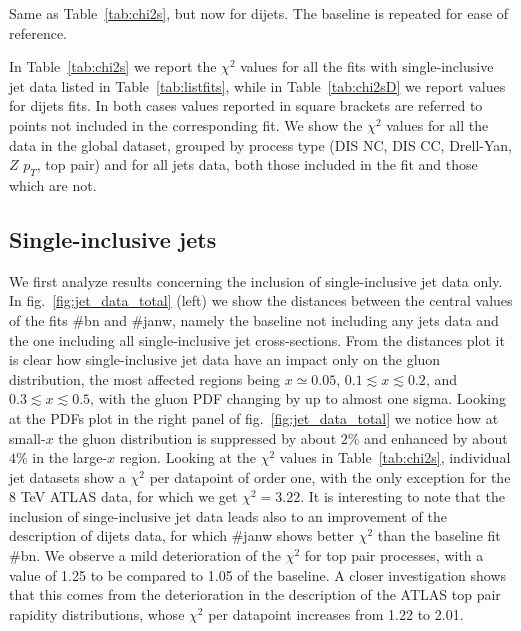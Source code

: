 \begin{table}[t]
    \renewcommand*{\arraystretch}{1.60}
    \scriptsize
    \centering
    
    \vspace{0.3cm}
    \caption{Same as Table~\ref{tab:chi2s}, but now for dijets. The
      baseline is repeated for ease of reference.}
    \label{tab:chi2sD}
\end{table}


%
In Table~\ref{tab:chi2s} we report the $\chi^2$ values for all the fits with single-inclusive jet data listed in 
Table~\ref{tab:listfits}, while in Table~\ref{tab:chi2sD} we report values for dijets fits.
In both cases values reported in square brackets are referred to points not included in the corresponding fit. 
We show the $\chi^2$ values for all the data in the global dataset, grouped by process type 
(DIS NC, DIS CC, Drell-Yan, $Z\,\,p_T$, top pair) and for all jets data, both those included in the fit 
and those which are not.
 

\subsection{Single-inclusive jets}
\label{sec:single_jet}
We first analyze results concerning the inclusion of single-inclusive jet data only.
In fig.~\ref{fig:jet_data_total} (left) we show the distances between the central values of the fits \#bn and \#janw, 
namely the baseline not including any jets data and the one including all single-inclusive jet cross-sections.
From the distances plot it is clear how single-inclusive jet data have an impact only on the gluon distribution,
the most affected regions being $x\simeq 0.05$, $0.1\lesssim x \lesssim 0.2$, and
$0.3\lesssim x\lesssim 0.5$, with the gluon PDF changing by up to almost one sigma. 
Looking at the PDFs plot in the right panel of fig.~\ref{fig:jet_data_total} we notice how at small-$x$ 
the gluon distribution is suppressed by about $2\%$ and enhanced by about $4\%$ in the large-$x$ region.
%
Looking at the $\chi^2$ values in Table~\ref{tab:chi2s}, individual jet datasets show a $\chi^2$ per datapoint 
of order one, with the only exception for the 8 TeV ATLAS data, for which we get $\chi^2 = 3.22$.
It is interesting to note that the inclusion of singe-inclusive jet data leads also to an improvement 
of the description of dijets data, for which \#janw shows better $\chi^2$ than the baseline fit \#bn.
%   
We observe a mild deterioration of the $\chi^2$ for top pair processes, with a value of 1.25 to be compared to
1.05 of the baseline. A closer investigation shows that this comes from the deterioration in the description 
of the ATLAS top pair rapidity distributions, whose $\chi^2$ per datapoint increases from 1.22 to 2.01.

